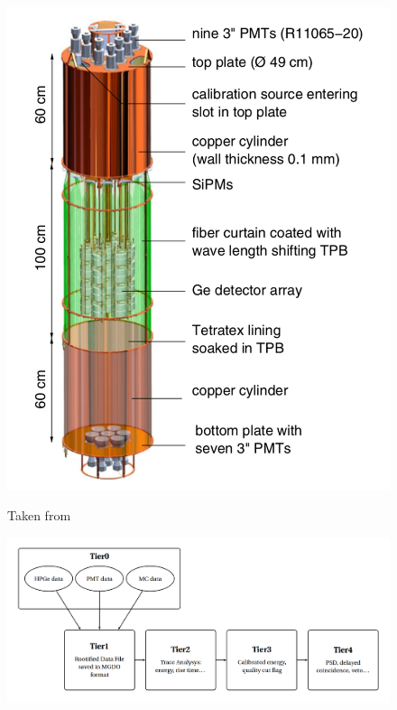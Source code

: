 \documentclass[encoding=utf8,british]{tumphthesis}
\begin{document}
\begin{figure}[t!]
	\centering
	\begin{minipage}{.30\textwidth}
		\centering
		\includegraphics[width=\textwidth]{./Bilder/LArVetoSetup.png}
		\caption{Taken from \cite{collaboration_upgrade_2018}}
		\label{fig:LArVetoSetup}
	\end{minipage}%
	\begin{minipage}{.70\textwidth}
		\centering
		\includegraphics[width=\textwidth]{./Bilder/TierStructure.png}
		\caption{}
		\label{fig:TierStructure}
	\end{minipage}
\end{figure}
\end{document}
